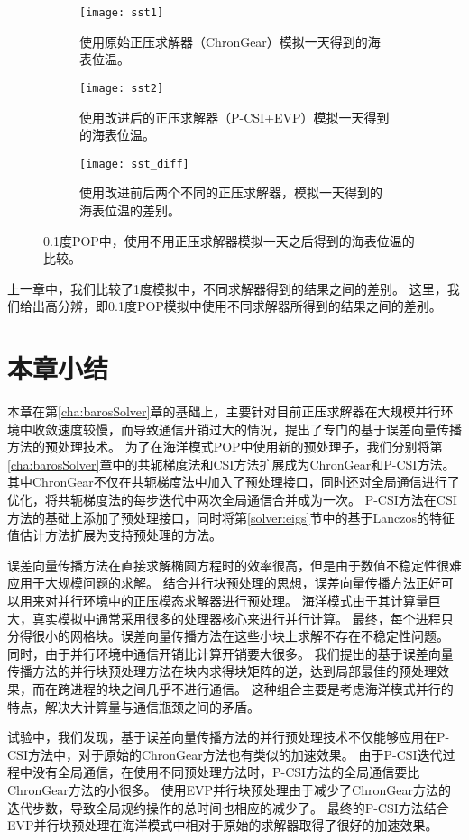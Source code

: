 \begin{figure}[!ht]
\centering
\begin{subfigure}[t]{1\textwidth}
\centering
\vspace{-20pt}
\texttt{[image: sst1]}
\vspace{-20pt}
\label {fig:sst1}
\caption{使用原始正压求解器（ChronGear）模拟一天得到的海表位温。}
\end{subfigure}
\begin{subfigure}[t]{1\textwidth}
\centering
\vspace{-5pt}
\texttt{[image: sst2]}
\vspace{-20pt}
\label {fig:sst2}
\caption{使用改进后的正压求解器（P-CSI+EVP）模拟一天得到的海表位温。}
\end{subfigure}
\begin{subfigure}[t]{1\textwidth}
\centering
\vspace{-5pt}
\texttt{[image: sst\_diff]}
\vspace{-20pt}
\label {fig:sst3}
\caption{使用改进前后两个不同的正压求解器，模拟一天得到的海表位温的差别。}
\vspace{5pt}
\end{subfigure}
\caption{0.1度POP中，使用不用正压求解器模拟一天之后得到的海表位温的比较。}
\label {fig:sst}
\end {figure}

上一章中，我们比较了1度模拟中，不同求解器得到的结果之间的差别。 
这里，我们给出高分辨，即0.1度POP模拟中使用不同求解器所得到的结果之间的差别。

\section{本章小结}
\label{precond:Conclusion}

本章在第\ref{cha:barosSolver}章的基础上，主要针对目前正压求解器在大规模并行环境中收敛速度较慢，而导致通信开销过大的情况，提出了专门的基于误差向量传播方法的预处理技术。
为了在海洋模式POP中使用新的预处理子，我们分别将第\ref{cha:barosSolver}章中的共轭梯度法和CSI方法扩展成为ChronGear和P-CSI方法。
其中ChronGear不仅在共轭梯度法中加入了预处理接口，同时还对全局通信进行了优化，将共轭梯度法的每步迭代中两次全局通信合并成为一次。 
P-CSI方法在CSI方法的基础上添加了预处理接口，同时将第\ref{solver:eigs}节中的基于Lanczos的特征值估计方法扩展为支持预处理的方法。


误差向量传播方法在直接求解椭圆方程时的效率很高，但是由于数值不稳定性很难应用于大规模问题的求解。
结合并行块预处理的思想，误差向量传播方法正好可以用来对并行环境中的正压模态求解器进行预处理。
海洋模式由于其计算量巨大，真实模拟中通常采用很多的处理器核心来进行并行计算。
最终，每个进程只分得很小的网格块。误差向量传播方法在这些小块上求解不存在不稳定性问题。 
同时，由于并行环境中通信开销比计算开销要大很多。
我们提出的基于误差向量传播方法的并行块预处理方法在块内求得块矩阵的逆，达到局部最佳的预处理效果，而在跨进程的块之间几乎不进行通信。
这种组合主要是考虑海洋模式并行的特点，解决大计算量与通信瓶颈之间的矛盾。


试验中，我们发现，基于误差向量传播方法的并行预处理技术不仅能够应用在P-CSI方法中，对于原始的ChronGear方法也有类似的加速效果。
由于P-CSI迭代过程中没有全局通信，在使用不同预处理方法时，P-CSI方法的全局通信要比ChronGear方法的小很多。
使用EVP并行块预处理由于减少了ChronGear方法的迭代步数，导致全局规约操作的总时间也相应的减少了。
最终的P-CSI方法结合EVP并行块预处理在海洋模式中相对于原始的求解器取得了很好的加速效果。